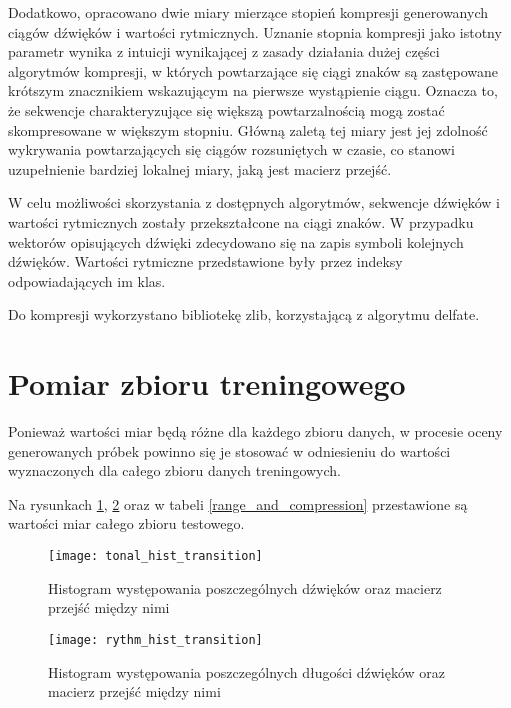 {{        Dodatkowo, opracowano dwie miary mierzące stopień kompresji generowanych ciągów dźwięków i\,\,wartości rytmicznych. 
        Uznanie stopnia kompresji jako istotny parametr wynika z\,\,intuicji wynikającej z\,\,zasady działania dużej części
        algorytmów kompresji, w\,\,których powtarzające się ciągi znaków są zastępowane krótszym znacznikiem wskazującym na pierwsze 
        wystąpienie ciągu. 
        Oznacza to, że sekwencje charakteryzujące się większą powtarzalnością mogą zostać skompresowane w\,\,większym stopniu.
        Główną zaletą tej miary jest jej zdolność wykrywania powtarzających się ciągów rozsuniętych w\,\,czasie, co stanowi uzupełnienie 
        bardziej lokalnej miary, jaką jest macierz przejść.

        W\,\,celu możliwości skorzystania z\,\,dostępnych algorytmów, sekwencje dźwięków i\,\,wartości rytmicznych zostały przekształcone
        na ciągi znaków. W\,\,przypadku wektorów opisujących dźwięki zdecydowano się na zapis symboli kolejnych dźwięków. Wartości
        rytmiczne przedstawione były przez indeksy odpowiadających im klas. 

        Do kompresji wykorzystano bibliotekę zlib, korzystającą z\,\,algorytmu delfate.
    }

    \section{Pomiar zbioru treningowego}
    {
        Ponieważ wartości miar będą różne dla każdego zbioru danych, w\,\,procesie oceny generowanych próbek powinno się je 
        stosować w\,\,odniesieniu do wartości wyznaczonych dla całego zbioru danych treningowych.
        
        Na rysunkach \ref{tonal_hist_transition}, \ref{rythm_hist_transition} oraz w\,\,tabeli \ref{range_and_compression} 
        przestawione są wartości miar całego zbioru testowego.

        \begin{figure}
            \centering
            \texttt{[image: tonal\_hist\_transition]}
            \caption{Histogram występowania poszczególnych dźwięków oraz macierz przejść między nimi}
            \label{tonal_hist_transition}
        \end{figure}

        \begin{figure}
            \centering
            \texttt{[image: rythm\_hist\_transition]}
            \caption{Histogram występowania poszczególnych długości dźwięków oraz macierz przejść między nimi}
            \label{rythm_hist_transition}
        \end{figure}

}}
